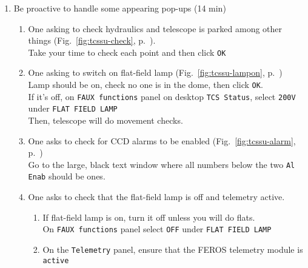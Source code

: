 \documentclass[11pt,fleqn]{book}
\def\figref#1{Fig.~\ref{fig:#1}, p.~\pageref{fig:#1}}
\begin{document}
\begin{enumerate}
\begin{enumerate}
          \begin{enumerate}
             \item On the \gls{tcs} screen, type \texttt{osf2p2StartUp ini ALL F8}, where ini is your initials.\label{list:tcsboot} (\figref{tcssu-launch})\\
                   Make sure \gls{wfi} is fully booted (\ref{list:wfibooted}) before going on with the \gls{tcs} start-up.
              \item Click \texttt{START} on the appearing startup window titled \texttt{ESO220 DAILY STARTUP} (\figref{tcssu-start})
          \end{enumerate}
          \item Be proactive to handle some appearing pop-ups (14 min) 
          \begin{enumerate}
             \item One asking to check hydraulics and telescope is parked among other things (\figref{tcssu-check}).\\
                   Take your time to check each point and then click \texttt{OK}          
             \item One asking to switch on flat-field lamp\label{list:tcsonline} (\figref{tcssu-lampon})\\
                   Lamp should be on, check no one is in the dome, then click \texttt{OK}.\\
                   If it's off,  on \texttt{FAUX functions} panel on desktop \texttt{TCS Status}, select \texttt{200V} under \texttt{FLAT FIELD LAMP}\\
                   Then, telescope will do movement checks.
             \item One asks to check for CCD alarms to be enabled (\figref{tcssu-alarm})\\
                   Go to the large, black text window where all numbers below the two \texttt{Al Enab} should be ones.
             \item One asks to check that the flat-field lamp is off and telemetry active.
                \begin{enumerate}
                 \item If flat-field lamp is on, turn it off unless you will do flats.\\
                   On \texttt{FAUX functions} panel select \texttt{OFF} under \texttt{FLAT FIELD LAMP}          
                 \item On the \texttt{Telemetry} panel, ensure that the FEROS telemetry module is \texttt{active}\\

\end{enumerate}
\end{enumerate}
\end{enumerate}
\end{enumerate}
\end{document}

